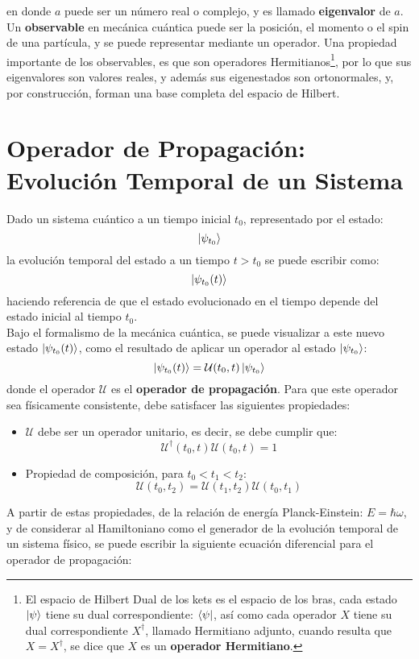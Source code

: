 en donde $a$ puede ser un número real o complejo, y es llamado \textbf{eigenvalor} de $\hat{a}$.
\\
Un \textbf{observable} en mecánica cuántica puede ser la posición, el momento o el spin de una partícula, y se puede representar mediante un operador. Una propiedad importante de los observables, es que son operadores Hermitianos\footnote{El espacio de Hilbert Dual de los kets es el espacio de los bras, cada estado $\ket{\psi}$ tiene su dual correspondiente: $\bra{\psi}$, así como cada operador $X$ tiene su dual correspondiente $X^\dag$, llamado Hermitiano adjunto, cuando resulta que $X = X^\dag$, se dice que $X$ es un \textbf{operador Hermitiano}.}, por lo que sus eigenvalores son valores reales, y además sus eigenestados son ortonormales, y, por construcción, forman una base completa del espacio de Hilbert.


\section{Operador de Propagación: Evolución Temporal de un Sistema}

Dado un sistema cuántico a un tiempo inicial $t_0$, representado por el estado: $$\ket{\psi_{t_0}}$$ la evolución temporal del estado a un tiempo $t>t_0$ se puede escribir como: $$\ket{\psi_{t_0}(t)}$$ haciendo referencia de que el estado evolucionado en el tiempo depende del estado inicial al tiempo $t_0$.
\\
Bajo el formalismo de la mecánica cuántica, se puede visualizar a este nuevo estado $\ket{\psi_{t_0}(t)}$, como el resultado de aplicar un operador al estado $\ket{\psi_{t_0}}$:
$$\ket{\psi_{t_0}(t)}=\mathcal{U}(t_0,t)\ket{\psi_{t_0}}$$
donde el operador $\mathcal{U}$ es el \textbf{operador de propagación}. Para que este operador sea físicamente consistente, debe satisfacer las siguientes propiedades:

\begin{itemize}[label=\textcolor{CTtitle}{\textbullet}]
\item $\mathcal{U}$ debe ser un operador unitario, es decir, se debe cumplir que: $$\mathcal{U}^\dag(t_0,t)\mathcal{U}(t_0,t)=1$$
\item Propiedad de composición, para $t_0<t_1<t_2$: $$\mathcal{U}(t_0,t_2) = \mathcal{U}(t_1,t_2)\mathcal{U}(t_0,t_1)$$  
\end{itemize}

A partir de estas propiedades, de la relación de energía Planck-Einstein: $E=\hbar\omega$, y de considerar al Hamiltoniano como el generador de la evolución temporal de un sistema físico\cite{Sakurai:1994}, se puede escribir la siguiente ecuación diferencial para el operador de propagación:

